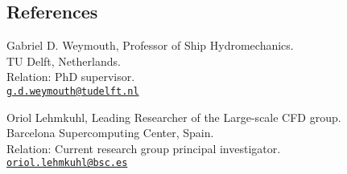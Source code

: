 \documentclass[line]{res}
\newenvironment{p1}
  {\begin{adjustwidth}{-16pt}{0pt}
  \vspace{1pt}}
  {\end{adjustwidth}}
\begin{document}
\begin{resume}
\section{References}\vspace{0.2cm}
\begin{p1}\setlength{\parskip}{1em}
Gabriel D. Weymouth, Professor of Ship Hydromechanics.\\
TU Delft, Netherlands.\\
Relation: PhD supervisor.\\
\href{mailto:g.d.weymouth@tudelft.nl}{\texttt{g.d.weymouth@tudelft.nl}}

Oriol Lehmkuhl, Leading Researcher of the Large-scale CFD group.\\
Barcelona Supercomputing Center, Spain.\\
Relation: Current research group principal investigator.\\
\href{mailto:oriol.lehmkuhl@bsc.es}{\texttt{oriol.lehmkuhl@bsc.es}}
\end{p1}
\end{resume}
\end{document}
